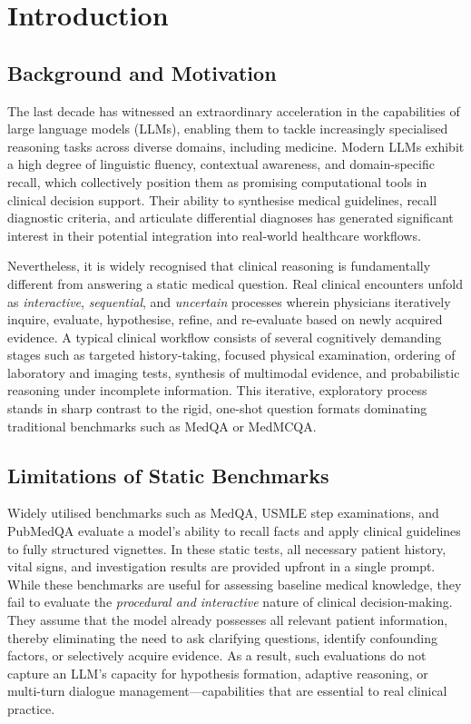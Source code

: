 \chapter{Introduction}
\label{Chapter1}

\section{Background and Motivation}

The last decade has witnessed an extraordinary acceleration in the capabilities of large language models (LLMs), enabling them to tackle increasingly specialised reasoning tasks across diverse domains, including medicine. Modern LLMs exhibit a high degree of linguistic fluency, contextual awareness, and domain-specific recall, which collectively position them as promising computational tools in clinical decision support. Their ability to synthesise medical guidelines, recall diagnostic criteria, and articulate differential diagnoses has generated significant interest in their potential integration into real-world healthcare workflows.

Nevertheless, it is widely recognised that clinical reasoning is fundamentally different from answering a static medical question. Real clinical encounters unfold as \textit{interactive}, \textit{sequential}, and \textit{uncertain} processes wherein physicians iteratively inquire, evaluate, hypothesise, refine, and re-evaluate based on newly acquired evidence. A typical clinical workflow consists of several cognitively demanding stages such as targeted history-taking, focused physical examination, ordering of laboratory and imaging tests, synthesis of multimodal evidence, and probabilistic reasoning under incomplete information. This iterative, exploratory process stands in sharp contrast to the rigid, one-shot question formats dominating traditional benchmarks such as MedQA or MedMCQA.

\section{Limitations of Static Benchmarks}

Widely utilised benchmarks such as MedQA, USMLE step examinations, and PubMedQA evaluate a model's ability to recall facts and apply clinical guidelines to fully structured vignettes. In these static tests, all necessary patient history, vital signs, and investigation results are provided upfront in a single prompt. While these benchmarks are useful for assessing baseline medical knowledge, they fail to evaluate the \textit{procedural and interactive} nature of clinical decision-making. They assume that the model already possesses all relevant patient information, thereby eliminating the need to ask clarifying questions, identify confounding factors, or selectively acquire evidence. As a result, such evaluations do not capture an LLM's capacity for hypothesis formation, adaptive reasoning, or multi-turn dialogue management---capabilities that are essential to real clinical practice.

